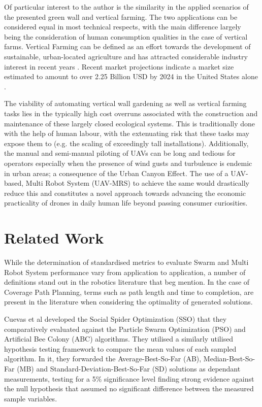 \documentclass{report}
\begin{document}
Of particular interest to the author is the similarity in the applied scenarios of the presented green wall and vertical farming. The two applications can be considered equal in most technical respects, with the main difference largely being the consideration of human consumption qualities in the case of vertical farms. Vertical Farming can be defined as an effort towards the development of sustainable, urban-located agriculture and has attracted considerable industry interest in recent years \cite{Banerjee2014}. Recent market projections indicate a market size estimated to amount to over 2.25 Billion USD by 2024 in the United States alone \cite{Gmi2017}.

The viability of automating vertical wall gardening as well as vertical farming tasks lies in the typically high cost overruns associated with the construction and maintenance of these largely closed ecological systems. This is traditionally done with the help of human labour, with the extenuating risk that these tasks may expose them to (e.g. the scaling of exceedingly tall installations). Additionally, the manual and semi-manual piloting of UAVs can be long and tedious for operators especially when the presence of wind gusts and turbulence is endemic in urban areas; a consequence of the Urban Canyon Effect. The use of a UAV-based, Multi Robot System (UAV-MRS) to achieve the same would drastically reduce this and constitutes a novel approach towards advancing the economic practicality of drones in daily human life beyond passing consumer curiosities.

\section{Related Work}

While the determination of standardised metrics to evaluate Swarm and Multi Robot System performance vary from application to application, a number of definitions stand out in the robotics literature that beg mention. In the case of Coverage Path Planning, terms such as path length and time to completion, are present in the literature \cite{Galceran2013} when considering the optimality of generated solutions.

Cuevas et al \cite{Cuevas2013} developed the Social Spider Optimization (SSO) that they comparatively evaluated against the Particle Swarm Optimization (PSO) and Artificial Bee Colony (ABC) algorithms. They utilised a similarly utilised hypothesis testing framework to compare the mean values of each sampled algorithm. In it, they forwarded the Average-Best-So-Far (AB), Median-Best-So-Far (MB) and Standard-Deviation-Best-So-Far (SD) solutions as dependant measurements, testing for a 5\% significance level finding strong evidence against the null hypothesis that assumed no significant difference between the measured sample variables.
\end{document}
